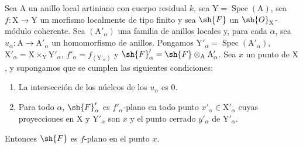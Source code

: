 \begin{proposition}[11.4.12]
\label{IV.11.4.12}
Sea $\mathrm{A}$ un anillo local artiniano con cuerpo residual $k$,
sea $\mathrm{Y}=\operatorname{Spec}(\mathrm{A})$, sea $f:\mathrm{X}\to\mathrm{Y}$ un morfismo localmente de tipo finito y sea $\sh{F}$ un $\sh{O}_\mathrm{X}$-módulo coherente.
Sea $(\mathrm{A}'_\alpha)$ una familia de anillos locales y, para cada $\alpha$, sea $u_\alpha:\mathrm{A}\to\mathrm{A}'_\alpha$ un homomorfismo
de anillos. Pongamos $\mathrm{Y}'_\alpha=\operatorname{Spec}(\mathrm{A}'_\alpha)$, $\mathrm{X}'_\alpha=\mathrm{X}\times_\mathrm{Y}\mathrm{Y}'_\alpha$,
$f'_\alpha=f_{(\mathrm{Y}'_\alpha)}$ y $\sh{F}'_\alpha=\sh{F}\otimes_\mathrm{A}\mathrm{A}'_\alpha$. Sea $x$ un punto
de $\mathrm{X}$, y supongamos que se cumplen las siguientes condiciones:
\begin{enumerate}[label=(\roman*)]
  \item La intersección de los núcleos de los $u_\alpha$ es $0$.
  \item Para todo $\alpha$, $\sh{F}'_\alpha$ es $f'_\alpha$-plano en todo punto $x'_\alpha\in\mathrm{X}'_\alpha$ cuyas proyecciones en $\mathrm{X}$ y $\mathrm{Y}'_\alpha$
  son $x$ y el punto cerrado $y'_\alpha$ de $\mathrm{Y}'_\alpha$.
\end{enumerate}

Entonces $\sh{F}$ es $f$-plano en el punto $x$.
\end{proposition}

